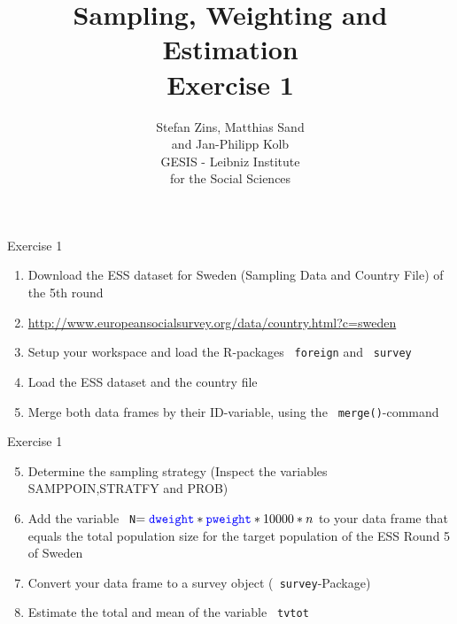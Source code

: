 \documentclass[11pt,german,hideothersubsections]{beamer}\usepackage[]{graphicx}\usepackage[]{color}
\title[Day 1]{Sampling, Weighting and Estimation\\ \Large{Exercise 1} }
\author[M. Sand]{Stefan Zins, Matthias Sand\\ and Jan-Philipp Kolb\\ \vspace{.5cm} \footnotesize{GESIS - Leibniz Institute\\ for the Social Sciences}}
\newcommand{\R}[1]{{\tt \color{blue}  #1}}
\begin{document}
\maketitle



\begin{frame}[fragile]{Exercise 1}

\begin{enumerate}

\item Download the ESS dataset for Sweden (Sampling Data and Country File) of the 5th round
\item[] \alert{\url{http://www.europeansocialsurvey.org/data/country.html?c=sweden}}
\item Setup your workspace and load the R-packages \R{foreign} and \R{survey}
\item Load the ESS dataset and the country file
\item Merge both data frames by their ID-variable, using the \R{merge()}-command

\end{enumerate}

\end{frame}
\begin{frame}[fragile]{Exercise 1}

\begin{enumerate}

\setcounter{enumi}{4}
\item Determine the sampling strategy (Inspect the variables \alert{SAMPPOIN},\alert{STRATFY} and \alert{PROB})
\item Add the variable \R{N}$=\R{dweight}*\R{pweight}*10000*n$ to your data frame that equals the total population size for the target population of the ESS Round 5 of Sweden
\item Convert your data frame to a survey object (\R{survey}-Package)
\item Estimate the total and mean of the variable \R{tvtot}

\end{enumerate}

\end{frame}
\end{document}
